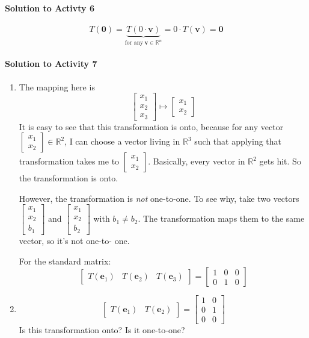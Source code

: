 \documentclass[titlepage, a4paper, 10pt]{article}
\renewcommand{\vec}[1]{\mathbf{#1}}
\begin{document}
\paragraph{Solution to Activty 6}
	\[T(\vec{0}) = \underbrace{T(0 \cdot \vec{v})}_{\text{for any} \ \vec{v} \in \mathbb{R}^n} = 0 \cdot T(\vec{v}) = \vec{0}\]

\paragraph{Solution to Activity 7}
	\begin{enumerate}
		\item The mapping here is \[\begin{bmatrix}x_1 \\ x_2 \\ x_3\end{bmatrix} \mapsto \begin{bmatrix}x_1 \\ x_2\end{bmatrix}\] It is easy to see that 
			this transformation is onto, because for any vector \(\begin{bmatrix}x_1 \\ x_2\end{bmatrix} \in \mathbb{R}^2\), I can choose a vector living
			in \(\mathbb{R}^3\) such that applying that transformation takes me to \(\begin{bmatrix}x_1 \\ x_2\end{bmatrix}\). Basically, every vector in 
			\(\mathbb{R}^2\) gets hit. So the transformation is onto. 

			However, the transformation is \emph{not} one-to-one. To see why, take two vectors \(\begin{bmatrix}x_1 \\ x_2 \\ b_1\end{bmatrix}\) and 
			\(\begin{bmatrix}x_1 \\ x_2 \\ b_2\end{bmatrix}\) with \(b_1 \ne b_2\). The transformation maps them to the same vector, so it's not one-to-
			one.
			
			For the standard matrix: \[\begin{bmatrix}T(\vec{e}_1) & T(\vec{e}_2) & T(\vec{e}_3)\end{bmatrix} = \begin{bmatrix}1 & 0 & 0 \\ 0 & 1 & 0 \end{bmatrix}\]
		\item \[\begin{bmatrix}T(\vec{e}_1) & T(\vec{e}_2)\end{bmatrix} = \begin{bmatrix}1 & 0 \\ 0 & 1\\ 0 & 0\end{bmatrix}\] Is this transformation 
			onto? Is it one-to-one?
	\end{enumerate}
\end{document}
